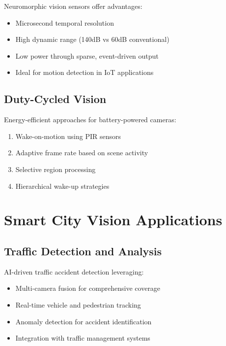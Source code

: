 \documentclass[12pt,a4paper]{article}
\begin{document}
Neuromorphic vision sensors offer advantages:
\begin{itemize}
    \item Microsecond temporal resolution
    \item High dynamic range (140dB vs 60dB conventional)
    \item Low power through sparse, event-driven output
    \item Ideal for motion detection in IoT applications
\end{itemize}

\subsection{Duty-Cycled Vision}

Energy-efficient approaches for battery-powered cameras:
\begin{enumerate}
    \item Wake-on-motion using PIR sensors
    \item Adaptive frame rate based on scene activity
    \item Selective region processing
    \item Hierarchical wake-up strategies
\end{enumerate}

\section{Smart City Vision Applications}

\subsection{Traffic Detection and Analysis}

AI-driven traffic accident detection leveraging:
\begin{itemize}
    \item Multi-camera fusion for comprehensive coverage
    \item Real-time vehicle and pedestrian tracking
    \item Anomaly detection for accident identification
    \item Integration with traffic management systems
\end{itemize}
\end{document}
